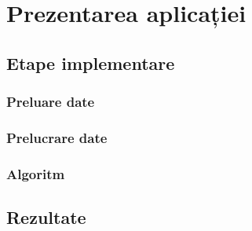 \chapter{Prezentarea aplicației}\label{ch:3implementare}
\section{Etape implementare}

\subsection{Preluare date}

\subsection{Prelucrare date}

\subsection{Algoritm}

\section{Rezultate}
